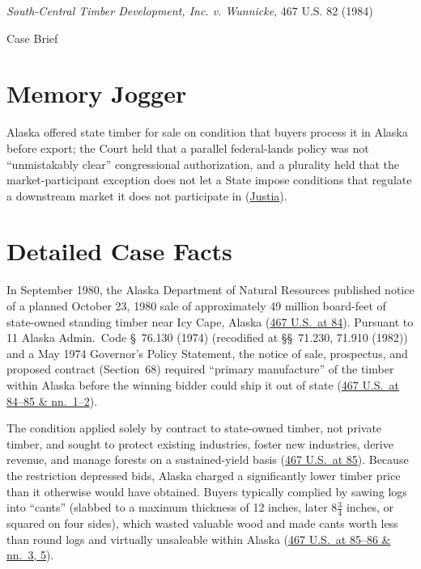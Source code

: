 \documentclass[12pt]{article}
\begin{document}
\begin{center}
{\LARGE \textit{South-Central Timber Development, Inc. v. Wunnicke}, 467 U.S. 82 (1984)\par}
\vspace{0.8em}
{\large Case Brief\par}
\end{center}
\vspace{1em}

\section{Memory Jogger}
Alaska offered state timber for sale on condition that buyers process it in Alaska before export; the Court held that a parallel federal-lands policy was not ``unmistakably clear'' congressional authorization, and a plurality held that the market-participant exception does not let a State impose conditions that regulate a downstream market it does not participate in (\href{https://supreme.justia.com/cases/federal/us/467/82/}{Justia}).

\section{Detailed Case Facts}
In September 1980, the Alaska Department of Natural Resources published notice of a planned October 23, 1980 sale of approximately 49 million board-feet of state-owned standing timber near Icy Cape, Alaska (\href{https://supreme.justia.com/cases/federal/us/467/82/}{467 U.S.\ at 84}). Pursuant to 11 Alaska Admin.\ Code \S\ 76.130 (1974) (recodified at \S\S\ 71.230, 71.910 (1982)) and a May 1974 Governor's Policy Statement, the notice of sale, prospectus, and proposed contract (Section~68) required ``primary manufacture'' of the timber within Alaska before the winning bidder could ship it out of state (\href{https://supreme.justia.com/cases/federal/us/467/82/}{467 U.S.\ at 84--85 \& nn.\ 1--2}).

The condition applied solely by contract to state-owned timber, not private timber, and sought to protect existing industries, foster new industries, derive revenue, and manage forests on a sustained-yield basis (\href{https://supreme.justia.com/cases/federal/us/467/82/}{467 U.S.\ at 85}). Because the restriction depressed bids, Alaska charged a significantly lower timber price than it otherwise would have obtained. Buyers typically complied by sawing logs into ``cants'' (slabbed to a maximum thickness of 12 inches, later $8\frac{3}{4}$ inches, or squared on four sides), which wasted valuable wood and made cants worth less than round logs and virtually unsaleable within Alaska (\href{https://supreme.justia.com/cases/federal/us/467/82/}{467 U.S.\ at 85--86 \& nn.\ 3, 5}).
\end{document}

